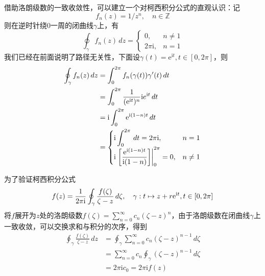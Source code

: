 借助洛朗级数的一致收敛性，可以建立一个对柯西积分公式的直观认识：记
$$f_n(z)=1/z^n,\quad n\in\mathbb{Z}$$
则在逆时针绕0一周的闭曲线$\gamma$上，有
\[\oint_{\gamma}f_n(z)\,dz=\begin{cases}0,&n\neq 1\\
    2\pi \mathrm{i},&n=1\end{cases}\]
我们已经在前面说明了路径无关性，下面设$\gamma(t)=\mathrm{e}^{\mathrm{i}t},t\in[0,2\pi]$，则
\begin{align*}
    \oint_{\gamma}f_n(z)\,dz&=\int_0^{2\pi}f_n(\gamma(t))\gamma'(t)\,dt\\
    &=\int_0^{2\pi}\frac{1}{(\mathrm{e}^{\mathrm{i}t})^n} \mathrm{i}e^{\mathrm{i}t}\,dt\\
    &=\mathrm{i}\int_0^{2\pi}\mathrm{e}^{\mathrm{i}(1-n)t}\,dt\\
    &=\begin{cases}
        \displaystyle\mathrm{i}\int_0^{2\pi}\,dt=2\pi \mathrm{i},&n=1\\
        \displaystyle\mathrm{i}\left.\left[\frac{\mathrm{e}^{\mathrm{i}(1-n)t}}{\mathrm{i}(1-n)}\right]\right|_{0}^{2\pi}=0,&n\neq 1
    \end{cases}
\end{align*}

为了验证柯西积分公式
\[f(z)=\frac{1}{2\pi \mathrm{i}}\oint_{\gamma}\frac{f(\zeta)}{\zeta-z}\,d\zeta,\quad \gamma:t\mapsto z+r\mathrm{e}^{\mathrm{i}t},t\in[0,2\pi]\]
将$f$展开为$z$处的洛朗级数$f(\zeta)=\sum_{n=0}^{\infty}c_n (\zeta-z)^n$，由于洛朗级数在闭曲线$\gamma$上一致收敛，可以交换求和与积分的次序，得到
\begin{align*}
    \oint_{\gamma}\frac{f(\zeta)}{\zeta-z}\,dz&=\oint_{\gamma}\sum_{n=0}^{\infty}c_n (\zeta-z)^{n-1}\,d\zeta\\
    &=\sum_{n=0}^{\infty}c_n\oint_{\gamma}(\zeta-z)^{n-1}\,d\zeta\\
    &=2\pi \mathrm{i} c_0=2\pi \mathrm{i} f(z)
\end{align*}

